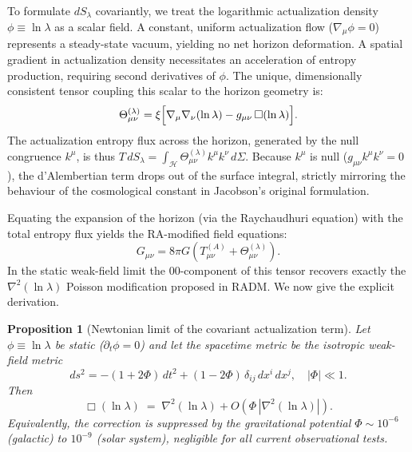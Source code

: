 \documentclass[11pt,a4paper]{article}
\theoremstyle{plain}
\newtheorem{proposition}[theorem]{Proposition}
\theoremstyle{definition}
\theoremstyle{remark}
\begin{document}
\begin{description}
To formulate $dS_\lambda$ covariantly, we treat the logarithmic actualization
density $\phi \equiv \ln\lambda$ as a scalar field. A constant, uniform
actualization flow ($\nabla_\mu\phi = 0$) represents a steady-state vacuum,
yielding no net horizon deformation. A spatial gradient in actualization density
necessitates an acceleration of entropy production, requiring second derivatives
of $\phi$. The unique, dimensionally consistent tensor coupling this scalar to
the horizon geometry is:
\begin{equation}
  \Theta_{\mu\nu}^{(\lambda)} = \xi
    \Bigl[\nabla_\mu\nabla_\nu(\ln\lambda)
          - g_{\mu\nu}\,\Box(\ln\lambda)\Bigr].
  \label{eq:actualization_tensor}
\end{equation}
The actualization entropy flux across the horizon, generated by the null
congruence $k^\mu$, is thus
$T\,dS_\lambda = \int_{\mathcal{H}} \Theta_{\mu\nu}^{(\lambda)}k^\mu k^\nu\,d\Sigma$.
Because $k^\mu$ is null ($g_{\mu\nu}k^\mu k^\nu = 0$), the d'Alembertian term
drops out of the surface integral, strictly mirroring the behaviour of the
cosmological constant in Jacobson's original formulation.

Equating the expansion of the horizon (via the Raychaudhuri equation) with the
total entropy flux yields the RA-modified field equations:
\begin{equation}
  G_{\mu\nu} = 8\pi G\!\left(T_{\mu\nu}^{(A)}
    + \Theta_{\mu\nu}^{(\lambda)}\right).
  \label{eq:RA_field_eqs}
\end{equation}
In the static weak-field limit the $00$-component of this tensor recovers
exactly the $\nabla^2(\ln\lambda)$ Poisson modification proposed in RADM.
We now give the explicit derivation.

\begin{proposition}[Newtonian limit of the covariant actualization term]
\label{prop:newtonian_limit}
Let $\phi \equiv \ln\lambda$ be static ($\partial_t\phi = 0$) and let the
spacetime metric be the isotropic weak-field metric
\begin{equation}
  ds^2 = -(1+2\Phi)\,dt^2 + (1-2\Phi)\,\delta_{ij}\,dx^i\,dx^j,
  \quad |\Phi| \ll 1.
\end{equation}
Then
\begin{equation}
  \Box(\ln\lambda) \;=\; \nabla^2(\ln\lambda) + O\!\left(\Phi\,|\nabla^2(\ln\lambda)|\right).
  \label{eq:box_limit}
\end{equation}
Equivalently, the correction is suppressed by the gravitational potential
$\Phi \sim 10^{-6}$ (galactic) to $10^{-9}$ (solar system), negligible
for all current observational tests.
\end{proposition}


\end{description}
\end{document}
